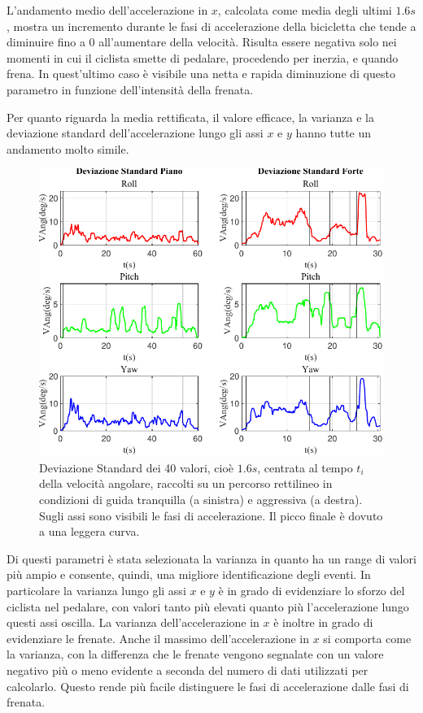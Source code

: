 \documentclass[class=article]{standalone}
\begin{document}
	L'andamento medio dell'accelerazione in \(x\), calcolata come media degli ultimi \(1.6s\), mostra un incremento durante le fasi di accelerazione della bicicletta che tende a diminuire fino a \(0\) all'aumentare della velocità.
	Risulta essere negativa solo nei momenti in cui il ciclista smette di pedalare, procedendo per inerzia, e quando frena. In quest'ultimo caso è visibile una netta e rapida diminuzione di questo parametro in funzione dell'intensità della frenata.
	
	Per quanto riguarda la media rettificata, il valore efficace, la varianza e la deviazione standard dell'accelerazione lungo gli assi \(x\) e \(y\) hanno tutte un andamento molto simile.
	
	\begin{center}
		\begin{figure}[h!]
			\centering\includegraphics[width=.7\textwidth]{img/lungaFP/VAng/Deviazione Standard}
			\caption[]{Deviazione Standard dei 40 valori, cioè \(1.6s\), centrata al tempo \(t_{i}\) della velocità angolare, raccolti su un percorso rettilineo in condizioni di guida tranquilla (a sinistra) e aggressiva (a destra). Sugli assi sono visibili le fasi di accelerazione. Il picco finale è dovuto a una leggera curva.}
			\label{fig:VAngStd_lungaFP}
		\end{figure}
	\end{center}
	
	Di questi parametri è stata selezionata la varianza in quanto ha un range di valori più ampio e consente, quindi, una migliore identificazione degli eventi. In particolare la varianza lungo gli assi \(x\) e \(y\) è in grado di evidenziare lo sforzo del ciclista nel pedalare, con valori tanto più elevati quanto più l'accelerazione lungo questi assi oscilla. La varianza dell'accelerazione in \(x\) è inoltre in grado di evidenziare le frenate.
	Anche il massimo dell'accelerazione in \(x\) si comporta come la varianza, con la differenza che le frenate vengono segnalate con un valore negativo più o meno evidente a seconda del numero di dati utilizzati per calcolarlo. Questo rende più facile distinguere le fasi di accelerazione dalle fasi di frenata.
	
\end{document}
